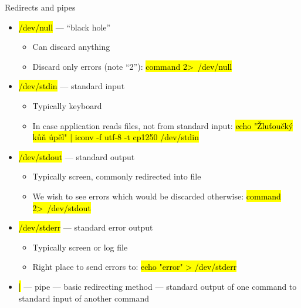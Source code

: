 \documentclass[compress, ucs, xelatex, 11pt, xcolor=svgnames,
  hyperref={
    bookmarks=true,
    unicode=true,
    colorlinks=true,
    pdftitle={Linux, command line and MetaCentrum},
    plainpages=false,
    pdfauthor={Vojtech Zeisek},
    pdfsubject={Course about use of Linux command line, writing shell scripts and using MetaCentrum of CESNET},
    pdfcreator={XeLaTeX},
    pdfkeywords={Linux, GNU, BASH, shell, command line, MetaCentrum},
    linkcolor=DarkRed,
    anchorcolor=DarkBlue,
    citecolor=Indigo,
    filecolor=NavyBlue,
    menucolor=DarkMagenta,
    urlcolor=DarkBlue,
    pdftex},
  url={hyphens, lowtilde} %
  ]{beamer}
\renewcommand{\texttt}[1]{\hl{\ttfamily #1}}
\begin{document}
\begin{frame}{Redirects and pipes}
  \label{pipe}
  \begin{itemize}
    \item \texttt{/dev/null} --- ``black hole''
    \begin{itemize}
      \item Can discard anything
      \item Discard only errors (note ``2''): \texttt{command 2\textgreater~/dev/null}
    \end{itemize}
    \item \texttt{/dev/stdin} --- standard input
    \begin{itemize}
      \item Typically keyboard
      \item In case application reads files, not from standard input: \texttt{echo "Žluťoučký kůň úpěl" | iconv -f utf-8 -t cp1250 /dev/stdin}
    \end{itemize}
    \item \texttt{/dev/stdout} --- standard output
    \begin{itemize}
      \item Typically screen, commonly redirected into file
      \item We wish to see errors which would be discarded otherwise: \texttt{command 2\textgreater~/dev/stdout}
    \end{itemize}
    \item \texttt{/dev/stderr} --- standard error output
    \begin{itemize}
      \item Typically screen or log file
      \item Right place to send errors to: \texttt{echo "error" > /dev/stderr}
    \end{itemize}
    \item \texttt{|} --- pipe --- basic redirecting method --- standard output of one command to standard input of another command
  \end{itemize}
\end{frame}
\end{document}

